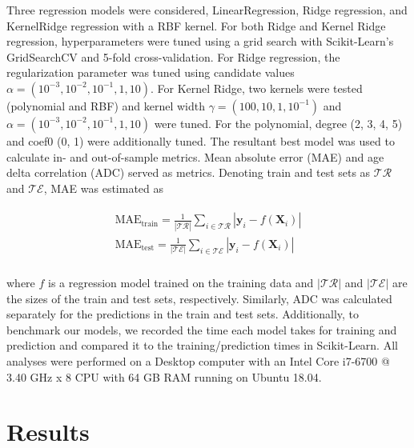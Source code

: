 \documentclass[utf8]{frontiersSCNS} %
\newcommand{\X}{\mathbf{X}}
\newcommand{\y}{\mathbf{y}}
\begin{document}
Three regression models were considered, LinearRegression, Ridge regression, and KernelRidge regression with a RBF kernel. For both Ridge and Kernel Ridge regression, hyperparameters were tuned using a grid search with Scikit-Learn's GridSearchCV and 5-fold cross-validation. 
For Ridge regression, the regularization parameter was tuned using candidate values $\alpha=(10^{-3}, 10^{-2}, 10^{-1}, 1, 10)$. For Kernel Ridge, two kernels were tested (polynomial and RBF) and kernel width $\gamma = (100, 10, 1, 10^{-1})$ and $\alpha = (10^{-3}, 10^{-2}, 10^{-1}, 1, 10)$ were tuned. For the polynomial, degree (2, 3, 4, 5) and  coef0 (0, 1) were additionally tuned. The resultant best model was used to calculate in- and out-of-sample metrics.
Mean absolute error (MAE) and  age delta correlation (ADC) served as metrics. Denoting train and test sets as $\mathcal{TR}$ and $\mathcal{TE}$, MAE was estimated as

\begin{align}
\begin{split}
\text{MAE}_\text{train} = \frac{1}{|\mathcal{TR}|} \sum_{i\in\mathcal{TR}}|\y_i - f(\X_i)|\\
\text{MAE}_\text{test} = \frac{1}{|\mathcal{TE
}|} \sum_{i\in\mathcal{TE}}|\y_i - f(\X_i)|\\
\end{split}
\end{align}

where $f$ is a regression model trained on the training data and  $|\mathcal{TR}|$ and $|\mathcal{TE}|$ are the sizes of the train and test sets, respectively. Similarly, ADC was calculated separately for the predictions in the train and test sets. Additionally, to benchmark our models, we recorded the time each model takes for training and prediction and compared it to the training/prediction times in Scikit-Learn. All analyses were performed on a Desktop computer with an Intel Core i7-6700 @ 3.40 GHz x 8 CPU with 64 GB RAM running on Ubuntu 18.04. 



\section{Results}
\end{document}
